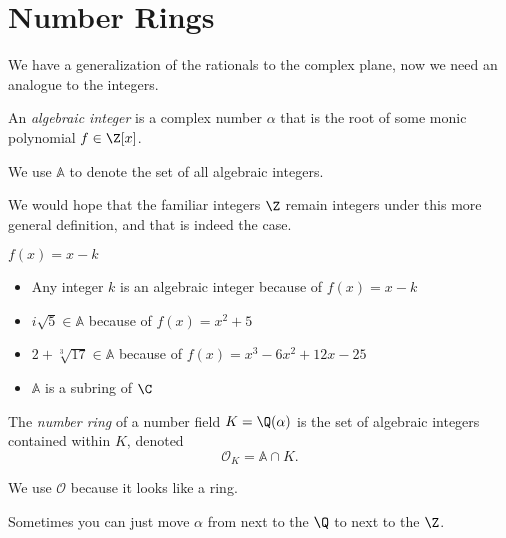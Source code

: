 \section{Number Rings}

We have a generalization of the rationals to the complex plane, now we need an analogue to the integers.

\begin{definition}
	An \emph{algebraic integer} is a complex number $\alpha$ that is the root of some monic polynomial $f \in \Z[x]$.

	We use $\mathbb A$ to denote the set of all algebraic integers.
\end{definition}

We would hope that the familiar integers $\Z$ remain integers under this more general definition, and that is indeed the case.

$f(x) = x - k$

\begin{itemize}
	\item Any integer $k$ is an algebraic integer because of $f(x) = x - k$
	\item $i \sqrt 5 \in \mathbb A$ because of $f(x) = x^2 + 5$
	\item $2 + \sqrt[3]{17} \in \mathbb A$ because of $f(x) = x^3 - 6 x^2 + 12 x - 25$
	\item $\mathbb A$ is a subring of $\C$
\end{itemize}


\begin{definition}
	The \emph{number ring} of a number field $K = \Q(\alpha)$ is the set of algebraic integers contained within $K$, denoted
	\begin{equation*}
		\mathcal O_K = \mathbb A \cap K.
	\end{equation*}
\end{definition}

We use $\mathcal O$ because it looks like a ring.


Sometimes you can just move $\alpha$ from next to the $\Q$ to next to the $\Z$.


